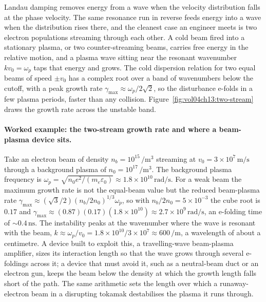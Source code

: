 Landau damping removes energy from a wave when the velocity distribution
falls at the phase velocity. The same resonance run in reverse feeds energy
into a wave when the distribution rises there, and the cleanest case an
engineer meets is two electron populations streaming through each other. A
cold beam fired into a stationary plasma, or two counter-streaming beams,
carries free energy in the relative motion, and a plasma wave sitting near
the resonant wavenumber $k v_0 = \omega_p$ taps that energy and grows. The
cold dispersion relation for two equal beams of speed $\pm v_0$ has a complex
root over a band of wavenumbers below the cutoff, with a peak growth rate
$\gamma_{\max}\approx\omega_p/2\sqrt{2}$, so the disturbance e-folds in a few
plasma periods, faster than any collision. Figure~\ref{fig:vol04ch13:two-stream}
draws the growth rate across the unstable band.



\paragraph{Worked example: the two-stream growth rate and where a beam-plasma device sits.}
Take an electron beam of density $n_b = 10^{15}\,\si{\per\meter\cubed}$
streaming at $v_0 = 3\times 10^{7}\,\si{\meter\per\second}$ through a
background plasma of $n_0 = 10^{17}\,\si{\per\meter\cubed}$. The background
plasma frequency is $\omega_p = \sqrt{n_0 e^{2}/(m_e\varepsilon_0)} \approx
1.8\times 10^{10}\,\si{\radian\per\second}$. For a weak beam the maximum
growth rate is not the equal-beam value but the reduced beam-plasma rate
$\gamma_{\max}\approx (\sqrt{3}/2)(n_b/2n_0)^{1/3}\omega_p$, so with $n_b/2n_0
= 5\times 10^{-3}$ the cube root is $0.17$ and $\gamma_{\max}\approx
(0.87)(0.17)(1.8\times 10^{10}) \approx 2.7\times 10^{9}\,\si{\radian\per
\second}$, an e-folding time of $\sim 0.4\,\si{\nano\second}$. The instability
peaks at the wavenumber where the wave is resonant with the beam,
$k\approx\omega_p/v_0 = 1.8\times 10^{10}/3\times 10^{7} \approx 600\,\si{
\per\meter}$, a wavelength of about a centimetre. A device built to exploit
this, a travelling-wave beam-plasma amplifier, sizes its interaction length so
that the wave grows through several e-foldings across it; a device that must
avoid it, such as a neutral-beam duct or an electron gun, keeps the beam
below the density at which the growth length falls short of the path. The same
arithmetic sets the length over which a runaway-electron beam in a disrupting
tokamak destabilises the plasma it runs through.

